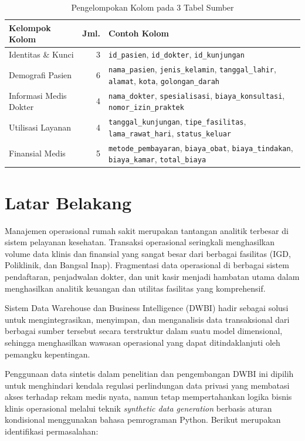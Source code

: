 \begin{table}[H]
\centering
\caption{Pengelompokan Kolom pada 3 Tabel Sumber}
\small
\begin{tabularx}{\linewidth}{p{4.5cm}rX}
\toprule
\textbf{Kelompok Kolom} & \textbf{Jml.} & \textbf{Contoh Kolom} \\
\midrule
Identitas \& Kunci    & 3 & \texttt{id\_pasien}, \texttt{id\_dokter}, \texttt{id\_kunjungan} \\
Demografi Pasien      & 6 & \texttt{nama\_pasien}, \texttt{jenis\_kelamin}, \texttt{tanggal\_lahir}, \texttt{alamat}, \texttt{kota}, \texttt{golongan\_darah} \\
Informasi Medis Dokter & 4 & \texttt{nama\_dokter}, \texttt{spesialisasi}, \texttt{biaya\_konsultasi}, \texttt{nomor\_izin\_praktek} \\
Utilisasi Layanan     & 4 & \texttt{tanggal\_kunjungan}, \texttt{tipe\_fasilitas}, \texttt{lama\_rawat\_hari}, \texttt{status\_keluar} \\
Finansial Medis       & 5 & \texttt{metode\_pembayaran}, \texttt{biaya\_obat}, \texttt{biaya\_tindakan}, \texttt{biaya\_kamar}, \texttt{total\_biaya} \\
\bottomrule
\end{tabularx}
\end{table}
 
\section{Latar Belakang}
 
Manajemen operasional rumah sakit merupakan tantangan analitik terbesar di sistem pelayanan kesehatan. Transaksi operasional seringkali menghasilkan volume data klinis dan finansial yang sangat besar dari berbagai fasilitas (IGD, Poliklinik, dan Bangsal Inap). Fragmentasi data operasional di berbagai sistem pendaftaran, penjadwalan dokter, dan unit kasir menjadi hambatan utama dalam menghasilkan analitik keuangan dan utilitas fasilitas yang komprehensif.
 
Sistem Data Warehouse dan Business Intelligence (DWBI) hadir sebagai solusi untuk mengintegrasikan, menyimpan, dan menganalisis data transaksional dari berbagai sumber tersebut secara terstruktur dalam suatu model dimensional, sehingga menghasilkan wawasan operasional yang dapat ditindaklanjuti oleh pemangku kepentingan.
 
Penggunaan data sintetis dalam penelitian dan pengembangan DWBI ini dipilih untuk menghindari kendala regulasi perlindungan data privasi yang membatasi akses terhadap rekam medis nyata, namun tetap mempertahankan logika bisnis klinis operasional melalui teknik \textit{synthetic data generation} berbasis aturan kondisional menggunakan bahasa pemrograman Python. Berikut merupakan identifikasi permasalahan:
 
